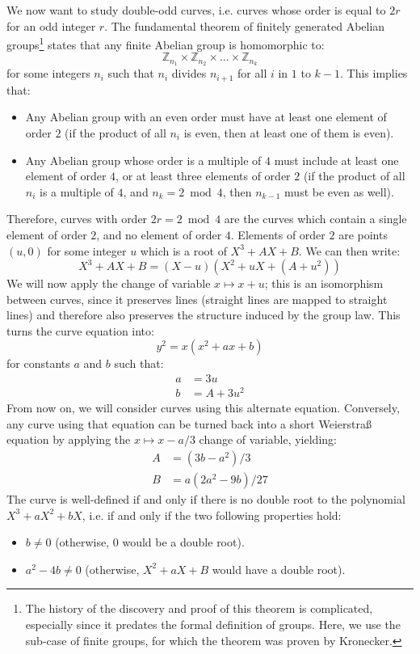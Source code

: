 \documentclass{llncs}
\newcommand{\bZ}{\mathbb{Z}}
\begin{document}
We now want to study double-odd curves, i.e. curves whose order is equal
to $2r$ for an odd integer $r$. The fundamental theorem of finitely
generated Abelian groups\footnote{The history of the discovery and proof
of this theorem is complicated, especially since it predates the formal
definition of groups. Here, we use the sub-case of finite groups, for
which the theorem was proven by Kronecker\cite{Kro1870}.} states that
any finite Abelian group is homomorphic to:
$$ \bZ_{n_1} \times \bZ_{n_2} \times ... \times \bZ_{n_k} $$
for some integers $n_i$ such that $n_i$ divides $n_{i+1}$ for all
$i$ in $1$ to $k-1$. This implies that:
\begin{itemize}

    \item Any Abelian group with an even order must have at least one
    element of order $2$ (if the product of all $n_i$ is even, then at
    least one of them is even).

    \item Any Abelian group whose order is a multiple of $4$ must
    include at least one element of order $4$, or at least three
    elements of order $2$ (if the product of all $n_i$ is a multiple
    of $4$, and $n_k = 2\bmod 4$, then $n_{k-1}$ must be even as
    well).

\end{itemize}
Therefore, curves with order $2r = 2 \bmod 4$ are the curves which
contain a single element of order $2$, and no element of order $4$.
Elements of order $2$ are points $(u, 0)$ for some integer $u$ which
is a root of $X^3 + AX + B$. We can then write:
    $$ X^3 + AX + B = (X - u) (X^2 + uX + (A + u^2)) $$
We will now apply the change of variable $x \mapsto x + u$; this is an
isomorphism between curves, since it preserves lines (straight lines are
mapped to straight lines) and therefore also preserves the structure
induced by the group law. This turns the curve equation into:
    $$ y^2 = x (x^2 + ax + b) $$
for constants $a$ and $b$ such that:
\begin{align*}
    a &= 3u \\
    b &= A + 3u^2
\end{align*}
From now on, we will consider curves using this alternate equation.
Conversely, any curve using that equation can be turned back into a
short Weierstraß equation by applying the $x \mapsto x - a/3$
change of variable, yielding:
\begin{align*}
    A &= (3b - a^2) / 3 \\
    B &= a(2a^2 - 9b) / 27
\end{align*}
The curve is well-defined if and only if there is no double root to
the polynomial $X^3 + aX^2 + bX$, i.e. if and only if the two following
properties hold:
\begin{itemize}

    \item $b \neq 0$ (otherwise, $0$ would be a double root).

    \item $a^2 - 4b \neq 0$ (otherwise, $X^2+aX+B$ would have a
    double root).

\end{itemize}
\end{document}
